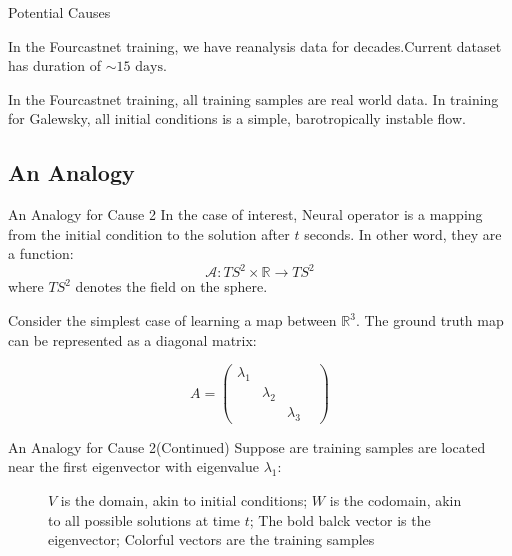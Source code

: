 \documentclass{beamer}
\begin{document}
\begin{frame}{Potential Causes}
\begin{tcolorbox}[colframe=blue!60!white, title=Cause 1. Simulation is too short]

In the Fourcastnet training, we have reanalysis data for decades.Current dataset has duration of $\sim \text{15 days}$.

\end{tcolorbox}

\begin{tcolorbox}[colframe=blue!60!white, title=Cause 2. Samples lack the variability]

In the Fourcastnet training, all training samples are real world data. In training for Galewsky, all initial conditions is a simple, barotropically instable flow. 
\end{tcolorbox}
    
\end{frame}
\subsection{An Analogy}
\begin{frame}{An Analogy for Cause 2}
    In the case of interest, Neural operator is a mapping from the initial condition to the solution after $t$ seconds. In other word, they are a function:
    $$\mathcal A:TS^2 \times \mathbb{R}\to TS^2$$
    where $TS^2$ denotes the field on the sphere.

    Consider the simplest case of learning a map between $\mathbb{R}^3$. The ground truth map can be represented as a diagonal matrix:

    \begin{equation}
        A=\begin{pmatrix}
            \lambda _1 & &  \\
            & \lambda_2 & &\\
            & & \lambda_3  &
        \end{pmatrix}
    \end{equation}
    
\end{frame}

\begin{frame}{An Analogy for Cause 2(Continued)}
Suppose are training samples are located near the first eigenvector with eigenvalue $\lambda_1$: 
    \begin{figure}
        \centering
        
        \caption{$V$ is the domain, akin to initial conditions; $W$ is the codomain, akin to all possible solutions at time $t$; The bold balck vector is the eigenvector; Colorful vectors are the training samples}
        \label{fig:placeholder}
    \end{figure}
\end{frame}
\end{document}
